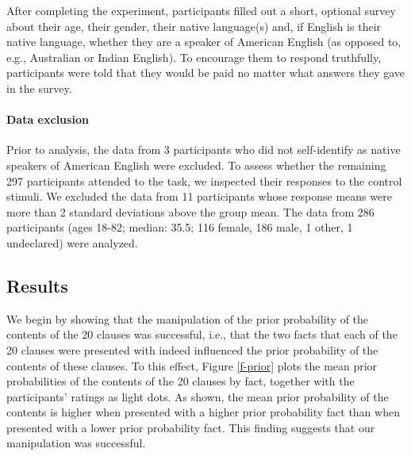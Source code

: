 \documentclass[11pt,fleqn]{article}
\newcommand{\6}{\mbox{$[\hspace*{-.6mm}[$}}
\newcommand{\9}{\mbox{$]\hspace*{-.6mm}]$}}
\begin{document}
After completing the experiment, participants filled out a short, optional survey about their age, their gender, their native language(s) and, if English is their native language, whether they are a speaker of American English (as opposed to, e.g., Australian or Indian English). To encourage them to respond truthfully, participants were told that they would be paid no matter what answers they gave in the survey.

\paragraph{Data exclusion} Prior to analysis, the data from 3 participants who did not self-identify as native speakers of American English were excluded. To assess whether the remaining 297 participants attended to the task, we inspected their responses to the control stimuli. We excluded the data from 11 participants whose response means were more than 2 standard deviations above the group mean. The data from 286 participants (ages 18-82; median: 35.5; 116 female, 186 male, 1 other, 1 undeclared) were analyzed.

\subsection{Results}

We begin by showing that the manipulation of the prior probability of the contents of the 20 clauses was successful, i.e., that the two facts that each of the 20 clauses were presented with indeed influenced the prior probability of the contents of these clauses. To this effect, Figure \ref{f-prior} plots the mean prior probabilities of the contents of the 20 clauses by fact, together with the participants' ratings as light dots. As shown, the mean prior probability of the contents is higher when presented with a higher prior probability fact than when presented with a lower prior probability fact. This finding suggests that our manipulation was successful. 
\end{document}

